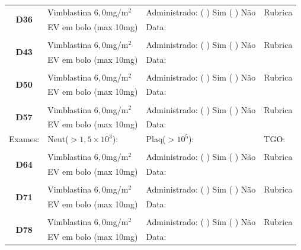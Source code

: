 \documentclass[11pt,a4paper,oldfontcommands]{memoir}
\begin{document}
\begin{center}
\begin{longtable}{p{1cm}p{5cm}|p{5cm}|p{3cm}}
    \\
    \hline\\
    \hline
    \multicolumn{1}{c|}{\multirow{2}{*}{\textbf{D36}}}&{Vimblastina \(6,0\)mg/m\(^2\)}&{Administrado: (  ) Sim (  ) Não}&{Rubrica}\\
    \multicolumn{1}{c|}{}&{EV em bolo (max 10mg)}&{Data:}&\\
    \hline
    \\
    \hline
    \multicolumn{1}{c|}{\multirow{2}{*}{\textbf{D43}}}&{Vimblastina \(6,0\)mg/m\(^2\)}&{Administrado: (  ) Sim (  ) Não}&{Rubrica}\\
    \multicolumn{1}{c|}{}&{EV em bolo (max 10mg)}&{Data:}&\\
    \hline
    \\
    \hline
    \multicolumn{1}{c|}{\multirow{2}{*}{\textbf{D50}}}&{Vimblastina \(6,0\)mg/m\(^2\)}&{Administrado: (  ) Sim (  ) Não}&{Rubrica}\\
    \multicolumn{1}{c|}{}&{EV em bolo (max 10mg)}&{Data:}&\\
    \hline
    \\
    \hline
    \multicolumn{1}{c|}{\multirow{2}{*}{\textbf{D57}}}&{Vimblastina \(6,0\)mg/m\(^2\)}&{Administrado: (  ) Sim (  ) Não}&{Rubrica}\\
    \multicolumn{1}{c|}{}&{EV em bolo (max 10mg)}&{Data:}&\\
    \hline
    {\tiny{Exames:}}&{\tiny{Neut(\(>1,5\times10^3\)):}}&{\tiny{Plaq(\(>10^5\)):}}&{\tiny{TGO:}}
    \\
    \hline
    \\
    \hline
    \multicolumn{1}{c|}{\multirow{2}{*}{\textbf{D64}}}&{Vimblastina \(6,0\)mg/m\(^2\)}&{Administrado: (  ) Sim (  ) Não}&{Rubrica}\\
    \multicolumn{1}{c|}{}&{EV em bolo (max 10mg)}&{Data:}&\\
    \hline
    \\
    \hline
    \multicolumn{1}{c|}{\multirow{2}{*}{\textbf{D71}}}&{Vimblastina \(6,0\)mg/m\(^2\)}&{Administrado: (  ) Sim (  ) Não}&{Rubrica}\\
    \multicolumn{1}{c|}{}&{EV em bolo (max 10mg)}&{Data:}&\\
    \hline
    \\
    \hline
    \multicolumn{1}{c|}{\multirow{2}{*}{\textbf{D78}}}&{Vimblastina \(6,0\)mg/m\(^2\)}&{Administrado: (  ) Sim (  ) Não}&{Rubrica}\\
    \multicolumn{1}{c|}{}&{EV em bolo (max 10mg)}&{Data:}&\\
    \hline

\end{longtable}
\end{center}
\end{document}
